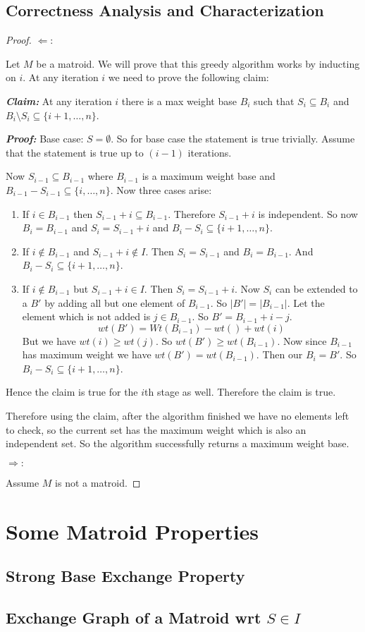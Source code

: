\subsection{Correctness Analysis and Characterization}
\begin{proof}
	$\Leftarrow:$\parinf
	
	Let $M$ be a matroid. We will prove that this greedy algorithm works by inducting on $i$. At any iteration $i$ we need to prove the following claim:
	
	\textbf{\textit{Claim:}} At any iteration $i$ there is a max weight base $B_i$ such that $S_i\subseteq B_i$ and $B_i\setminus S_i\subseteq \{i+1,\dots, n\}$.
	
	\textbf{\textit{Proof:}} Base case: $S=\emptyset$. So for base case the statement is true trivially. Assume that the statement is true up to $(i-1)$ iterations.\parinn
	
	Now $S_{i-1}\subseteq B_{i-1}$ where $B_{i-1}$ is a maximum weight base and $B_{i-1}-S_{i-1}\subseteq \{i,\dots, n\}$. Now three cases arise:
	\begin{enumerate}[label=\bfseries Case \arabic*:,leftmargin=1.5cm]
		\item If $i\in B_{i-1}$ then $S_{i-1}+i\subseteq B_{i-1}$. Therefore $S_{i-1}+i$ is independent. So now $B_i=B_{i-1}$ and $S_i=S_{i-1}+i$ and $B_i-S_i\subseteq \{i+1,\dots, n\}$.
		\item If $i\notin B_{i-1}$ and $S_{i-1}+i\notin I$. Then $S_i=S_{i-1}$ and $B_i=B_{i-1}$. And $B_i-S_i\subseteq \{i+1,\dots , n\}$.
		\item If $i\notin B_{i-1}$ but $S_{i-1}+i\in I$. Then $S_i=S_{i-1}+i$. Now $S_i$ can be extended to a $B'$ by adding all but one element of $B_{i-1}$. So $|B'|=|B_{i-1}|$. Let the element which is not added is $j\in B_{i-1}$. So $B'=B_{i-1}+i-j$. $$wt(B')=Wt(B_{i-1})-wt()+wt(i)$$But we have $wt(i)\geq wt(j)$. So $wt(B')\geq wt(B_{i-1})$. Now since $B_{i-1}$ has maximum weight we have $wt(B')=wt(B_{i-1})$. Then our $B_i=B'$. So $B_i-S_i\subseteq \{i+1,\dots, n\}$.
	\end{enumerate}
	Hence the claim is true for the $i$th stage as well. Therefore the claim is true.\Qed
	
	Therefore using the claim, after the algorithm finished we have no elements left to check, so the current set has the maximum weight which is also an independent set. So the algorithm successfully returns a maximum weight base.\parinf
	
	$\Rightarrow:$
	
	Assume $M$ is not a matroid.
	
\end{proof}
\section{Some Matroid Properties}
\subsection{Strong Base Exchange Property}
\subsection{Exchange Graph of a Matroid wrt ${S\in I}$}
